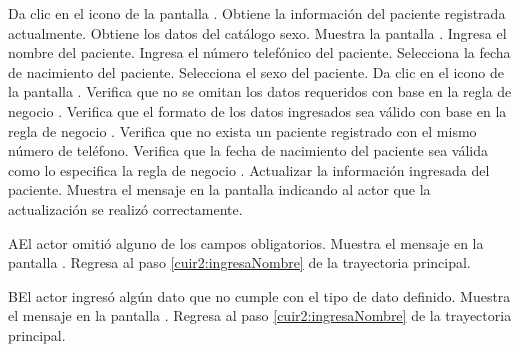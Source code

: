 \begin{UCtrayectoria}
	\UCpaso[\UCactor] Da clic en el icono \btnEditar de la pantalla .
	\UCpaso[\UCsist] Obtiene la información del paciente registrada actualmente.
	\UCpaso[\UCsist] Obtiene los datos del catálogo sexo.
	\UCpaso[\UCsist] Muestra la pantalla .
	\UCpaso[\UCactor] \label{cuir4:ingresaNombre}Ingresa el nombre del paciente.
	\UCpaso[\UCactor] Ingresa el número telefónico del paciente.
	\UCpaso[\UCactor] Selecciona la fecha de nacimiento del paciente.
	\UCpaso[\UCactor] Selecciona el sexo del paciente.
	\UCpaso[\UCactor] Da clic en el icono \btnRegistrar{} de la pantalla .
	\UCpaso[\UCsist] Verifica que no se omitan los datos requeridos con base en la regla de negocio . 
	\UCpaso[\UCsist] Verifica que el formato de los datos ingresados sea válido con base en la regla de negocio . 
	\UCpaso[\UCsist] Verifica que no exista un paciente registrado con el mismo número de teléfono. 
	\UCpaso[\UCsist] Verifica que la fecha de nacimiento del paciente sea válida como lo especifica la regla de negocio . 
	\UCpaso[\UCsist] Actualizar la información ingresada del paciente.
	\UCpaso[\UCsist] Muestra el mensaje  en la pantalla  indicando al actor que la actualización se realizó correctamente.
\end{UCtrayectoria}


\begin{UCtrayectoriaA}{A}{El actor omitió alguno de los campos obligatorios.}
	\UCpaso[\UCsist] Muestra el mensaje  en la pantalla .
	\UCpaso[] Regresa al paso \ref{cuir2:ingresaNombre} de la trayectoria principal.
\end{UCtrayectoriaA}

\begin{UCtrayectoriaA}{B}{El actor ingresó algún dato que no cumple con el tipo de dato definido.}
	\UCpaso[\UCsist] Muestra el mensaje  en la pantalla .
	\UCpaso[] Regresa al paso \ref{cuir2:ingresaNombre} de la trayectoria principal.
\end{UCtrayectoriaA}

